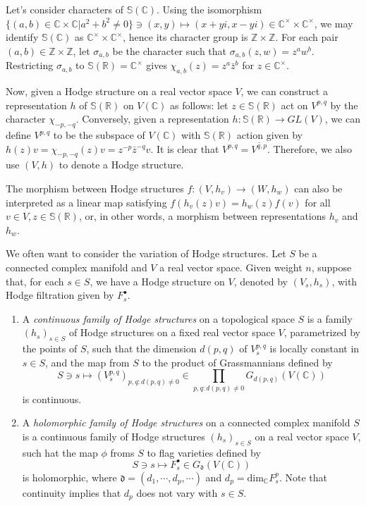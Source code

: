 Let's consider characters of $\mathbb S(\mathbb C)$. Using the isomorphism $ \{(a,b)\in \mathbb C \times \mathbb C|a^2+b^2 \ne0\} \ni (x,y) \mapsto (x+yi,x-yi) \in \mathbb C ^\times \times \mathbb C ^\times $, we may identify $\mathbb S(\mathbb C)$ as $\mathbb C ^\times \times \mathbb C ^\times $, hence its character group is $\mathbb Z \times \mathbb Z$. For each pair $(a,b)\in \mathbb Z \times \mathbb Z$, let $\sigma_{a,b}$ be the character such that $\sigma_{a,b}(z,w)=z^aw^b$. Restricting $\sigma_{a,b}$ to $\mathbb S(\mathbb R)=\mathbb C^\times$ gives $\chi_{a,b}(z)=z^a\bar z^b$ for $z\in \mathbb C^ \times$.

Now, given a Hodge structure on a real vector space $V$, we can construct a representation $h$ of $\mathbb S(\mathbb R)$ on $V(\mathbb C)$ as follows: let $z\in \mathbb S(\mathbb R)$ act on $V^{p,q}$ by the character $\chi_{-p,-q}$. Conversely, given a representation $h:\mathbb S(\mathbb R) \to GL(V)$, we can define $V^{p,q}$ to be the subspace of $V(\mathbb C)$ with $\mathbb S(\mathbb R)$ action given by $h(z)v=\chi_{-p,-q}(z)v=z^{-p}\bar z^{-q} v$. It is clear that $V^{p,q}=\overline{V^{q,p}}$. Therefore, we also use $(V,h)$ to denote a Hodge structure.

The morphism between Hodge structures $f:(V,h_v)\to (W,h_w)$ can also be interpreted as a linear map satisfying $f(h_v(z)v)=h_w(z)f(v)$ for all $v \in V, z\in \mathbb S(\mathbb R) $, or, in other words, a morphism between representations $h_v$ and $h_w$. 

We often want to consider the variation of Hodge structures. Let $S$ be a connected complex manifold and $V$ a real vector space. Given weight $n$, suppose that, for each $s\in S$, we have a Hodge structure on $V$, denoted by $(V_s,h_s)$, with Hodge filtration given by $F_s^\bullet$. 

\begin{definition}
 \label{definition-continuity-and-holomorphicity}
\begin{enumerate}
 \item  A {\it continuous family of Hodge structures} on a topological space $S$ is a family $(h_s)_{s \in S}$ of Hodge structures on a fixed real vector space $V$, parametrized by the points of $S$, such that the dimension $d(p,q)$ of $V_s^{p,q}$ is locally constant in $s\in S$, and the map from $S$ to the product of Grassmannians defined by
$$
S \ni s  \mapsto (V_s^{p,q})_{p,q:d(p,q)\ne 0} \in \prod_{p,q:d(p,q)\ne0}G_{d(p,q)}(V(\mathbb C))
$$
is continuous.

\item A {\it holomorphic family of Hodge structures} on a connected complex manifold $S$ is a continuous family of Hodge structures $(h_s)_{s \in S}$ on a real vector space $V$, such hat the map $\phi$ froms $S$ to flag varieties defined by
$$
S \ni s \mapsto F_s ^\bullet \in G_\mathfrak d (V(\mathbb C))
$$
is holomorphic, where $\mathfrak d= (d_1,\cdots,d_p,\cdots)$ and $d_p=\text{dim}_\mathbb C F^p_s $. Note that continuity implies that $d_p$ does not vary with $s\in S$.
\end{enumerate}

\end{definition}

